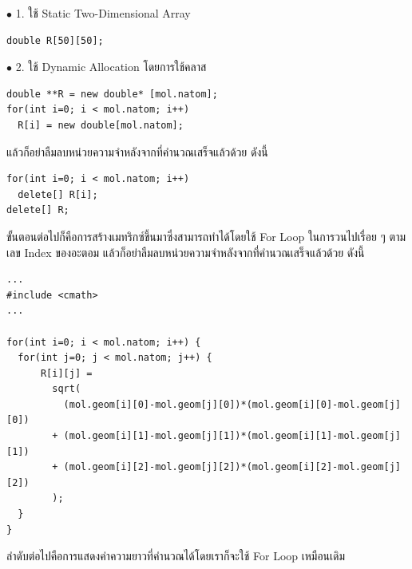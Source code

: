 \noindent $\bullet$ 1. ใช้ Static Two-Dimensional Array

\vspace{5pt}

\begin{lstlisting}[style=MyC++]
double R[50][50];
\end{lstlisting}

\vspace{5pt}

\noindent $\bullet$ 2. ใช้ Dynamic Allocation โดยการใช้คลาส 

\vspace{5pt}

\begin{lstlisting}[style=MyC++]
double **R = new double* [mol.natom];
for(int i=0; i < mol.natom; i++)
  R[i] = new double[mol.natom];
\end{lstlisting}
%
\vspace{5pt}
%
แล้วก็อย่าลืมลบหน่วยความจำหลังจากที่คำนวณเสร็จแล้วด้วย ดังนี้

\vspace{5pt}

\begin{lstlisting}[style=MyC++]
for(int i=0; i < mol.natom; i++)
  delete[] R[i];
delete[] R;
\end{lstlisting}

\vspace{5pt}

ขั้นตอนต่อไปก็คือการสร้างเมทริกซ์ขึ้นมาซึ่งสามารถทำได้โดยใช้ For Loop ในการวนไปเรื่อย ๆ ตามเลข Index ของอะตอม
%
\vspace{5pt}
%
แล้วก็อย่าลืมลบหน่วยความจำหลังจากที่คำนวณเสร็จแล้วด้วย ดังนี้

\vspace{5pt}

\begin{lstlisting}[style=MyC++]
...
#include <cmath>
...

for(int i=0; i < mol.natom; i++) {
  for(int j=0; j < mol.natom; j++) {
      R[i][j] = 
        sqrt(
          (mol.geom[i][0]-mol.geom[j][0])*(mol.geom[i][0]-mol.geom[j][0])
        + (mol.geom[i][1]-mol.geom[j][1])*(mol.geom[i][1]-mol.geom[j][1])
        + (mol.geom[i][2]-mol.geom[j][2])*(mol.geom[i][2]-mol.geom[j][2]) 
        );
  }
}
\end{lstlisting}

\vspace{5pt}

ลำดับต่อไปคือการแสดงค่าความยาวที่คำนวณได้โดยเราก็จะใช้ For Loop เหมือนเดิม


